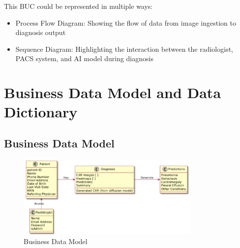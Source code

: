 \documentclass[12pt]{article}
\begin{document}
This BUC could be represented in multiple ways:
\begin{itemize}
    \item Process Flow Diagram: Showing the flow of data from image ingestion to diagnosis output
    \item Sequence Diagram: Highlighting the interaction between the radiologist, PACS system, and AI model during diagnosis
\end{itemize}


\section{Business Data Model and Data Dictionary}


\subsection{Business Data Model}
\begin{figure}[H]
    \centering
    \includegraphics[width=0.8\textwidth]{./images/bussiness_data_model.png}
    \caption{Business Data Model}
    \label{fig:business_data_model}
\end{figure}
\end{document}
